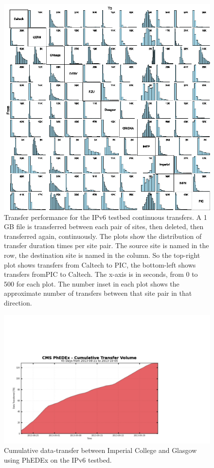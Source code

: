 \begin{figure}[htp]
\centering
\includegraphics{full-mesh}
\caption{Transfer performance for the IPv6 testbed continuous transfers. A 1 GB file is transferred between each pair of sites, then deleted, then transferred again, continuously. The plots show the distribution of transfer duration times per site pair. The source site is named in the row, the destination site is named in the column. So the top-right plot shows transfers from Caltech to PIC, the bottom-left shows transfers fromPIC to Caltech. The x-axis is in seconds, from 0 to 500 for each plot. The number inset in each plot shows the approximate number of transfers between that site pair in that direction.}\label{fig:full-mesh}
\end{figure}

\begin{figure}[htp]
\centering
\includegraphics{phedex-transfer-volume}
\caption{Cumulative data-transfer between Imperial College and Glasgow using PhEDEx on the IPv6 testbed.}\label{fig:phedex-transfer-volume}
\end{figure}

